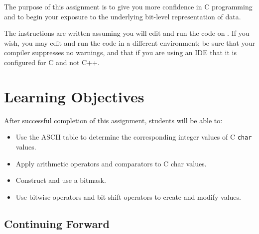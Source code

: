 

\usepackage{graphicx}
\usepackage{wrapfig}
\usepackage{ulem}
\usepackage{cancel}
\usepackage{multicol}

\renewcommand{\labnumber}{2}
\renewcommand{\labname}{Bit Manipulation Lab}
\renewcommand{\shortlabname}{keyboardlab}
\renewcommand{\collaborationrules}{\individualeffort}
\renewcommand{\duedate}{Week of January 31, before the start of your lab section}

\newcommand{\tab}{\ensuremath{\longrightarrow}}
\newcommand{\nl}{\ensuremath{\hookleftarrow}}

\startdocument
% 

The purpose of this assignment is to give you more confidence in C programming
and to begin your exposure to the underlying bit-level representation of data.

The instructions are written assuming you will edit and run the code on
\runtimeenvironment. If you wish, you may edit and run the code
in a different environment; be sure that your compiler suppresses no warnings,
and that if you are using an IDE that it is configured for C and not C++.

\section*{Learning Objectives}

After successful completion of this assignment, students will be able to:
\begin{itemize}
\item Use the ASCII table to determine the corresponding integer values of C
    \lstinline{char} values.
\item Apply arithmetic operators and comparators to C \lstinline{}{char} values.
\item Construct and use a bitmask.
\item Use bitwise operators and bit shift operators to create and modify values.
\end{itemize}

\subsection*{Continuing Forward}

